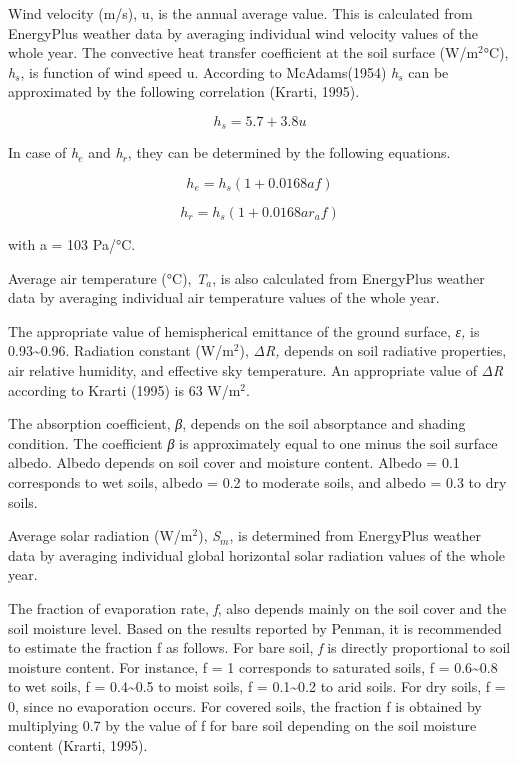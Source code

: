 Wind velocity (m/s), u, is the annual average value. This is calculated from EnergyPlus weather data by averaging individual wind velocity values of the whole year. The convective heat transfer coefficient at the soil surface (W/m\(^{2}\)°C), \emph{h\(_{s}\)}, is function of wind speed u. According to McAdams(1954) \emph{h\(_{s}\)} can be approximated by the following correlation (Krarti, 1995).

\begin{equation}
{h_s} = 5.7 + 3.8u
\end{equation}

In case of \emph{h\(_{e}\)} and \emph{h\(_{r}\)}, they can be determined by the following equations.

\begin{equation}
{h_e} = {h_s}\left( {1 + 0.0168af} \right)
\end{equation}

\begin{equation}
{h_r} = {h_s}\left( {1 + 0.0168a{r_a}f} \right)
\end{equation}

with a = 103 Pa/°C.

Average air temperature (°C), \emph{T\(_{a}\)}, is also calculated from EnergyPlus weather data by averaging individual air temperature values of the whole year.

The appropriate value of hemispherical emittance of the ground surface, \emph{ε,} is 0.93\textasciitilde{}0.96. Radiation constant (W/m\(^{2}\)), \emph{ΔR,} depends on soil radiative properties, air relative humidity, and effective sky temperature. An appropriate value of \emph{ΔR} according to Krarti (1995) is 63 W/m\(^{2}\).

The absorption coefficient, \emph{β}, depends on the soil absorptance and shading condition. The coefficient \emph{β} is approximately equal to one minus the soil surface albedo. Albedo depends on soil cover and moisture content. Albedo = 0.1 corresponds to wet soils, albedo = 0.2 to moderate soils, and albedo = 0.3 to dry soils.

Average solar radiation (W/m\(^{2}\)), \emph{S\(_{m}\)}, is determined from EnergyPlus weather data by averaging individual global horizontal solar radiation values of the whole year.

The fraction of evaporation rate, \emph{f}, also depends mainly on the soil cover and the soil moisture level. Based on the results reported by Penman, it is recommended to estimate the fraction f as follows. For bare soil, \emph{f} is directly proportional to soil moisture content. For instance, f = 1 corresponds to saturated soils, f = 0.6\textasciitilde{}0.8 to wet soils, f = 0.4\textasciitilde{}0.5 to moist soils, f = 0.1\textasciitilde{}0.2 to arid soils. For dry soils, f = 0, since no evaporation occurs. For covered soils, the fraction f is obtained by multiplying 0.7 by the value of f for bare soil depending on the soil moisture content (Krarti, 1995).

